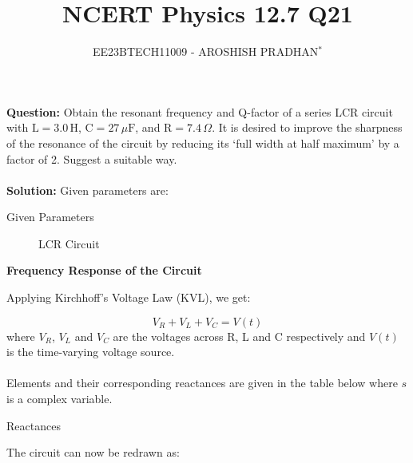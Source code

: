 \documentclass[journal,12pt,twocolumn]{IEEEtran}
\theoremstyle{remark}
\begin{document}

\vspace{3cm}

\title{NCERT Physics 12.7 Q21}
\author{EE23BTECH11009 - AROSHISH PRADHAN$^{*}$%
}
\maketitle
\newpage
\bigskip
\textbf{Question:} 
Obtain the resonant frequency and Q-factor of a series LCR circuit
with $\text{L} = 3.0\, \text{H}$, $\text{C} = 27\, \mu\text{F}$, and $\text{R} = 7.4\, \Omega$. It is desired to improve the
sharpness of the resonance of the circuit by reducing its `full width at half maximum' by a factor of 2. Suggest a suitable way.\\
\\
\textbf{Solution: }
Given parameters are:

\begin{table}[h]
    \centering
    \resizebox{8 cm}{!}{
    }
    \vspace{6 pt}
    \caption{Given Parameters}
    \label{tab:my_label}
\end{table}

\begin{figure}[h]
 \centering
    
    \caption{LCR Circuit}
    \label{fig:enter-label}
\end{figure}

\textbf{Frequency Response of the Circuit}

Applying Kirchhoff's Voltage Law (KVL), we get:

\begin{equation}
V_R + V_L + V_C = V(t) \label{eq:KVL}
\end{equation}
where $V_R$, $V_L$ and $V_C$ are the voltages across R, L and C respectively and $V(t)$ is the time-varying voltage source.\\
\\
Elements and their corresponding reactances are given in the table below where $s$ is a complex variable.\\

\begin{table}[h]
    \centering
    \resizebox{7 cm}{!}{
    
    }
    \vspace{6 pt}
    \caption{Reactances}
    \label{tab:2} 
\end{table}

The circuit can now be redrawn as:\\
\end{document}
